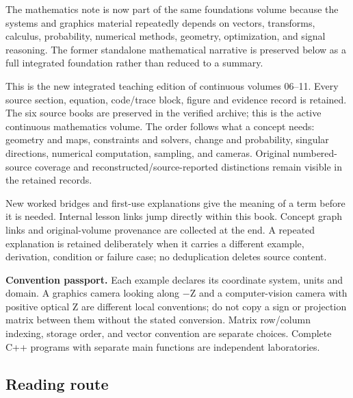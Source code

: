 \hypertarget{01-foundations-i-ch017-mathematical-foundations-for-visual-computing-from-vectors-to-images}{}

The mathematics note is now part of the same foundations volume because the systems and graphics material repeatedly depends on vectors, transforms, calculus, probability, numerical methods, geometry, optimization, and signal reasoning. The former standalone mathematical narrative is preserved below as a full integrated foundation rather than reduced to a summary.

This is the new integrated teaching edition of continuous volumes 06--11. Every source section, equation, code/trace block, figure and evidence record is retained. The six source books are preserved in the verified archive; this is the active continuous mathematics volume. The order follows what a concept needs: geometry and maps, constraints and solvers, change and probability, singular directions, numerical computation, sampling, and cameras. Original numbered-source coverage and reconstructed/source-reported distinctions remain visible in the retained records.

New worked bridges and first-use explanations give the meaning of a term before it is needed. Internal lesson links jump directly within this book. Concept graph links and original-volume provenance are collected at the end. A repeated explanation is retained deliberately when it carries a different example, derivation, condition or failure case; no deduplication deletes source content.

\textbf{Convention passport.} Each example declares its coordinate system, units and domain. A graphics camera looking along −Z and a computer-vision camera with positive optical Z are different local conventions; do not copy a sign or projection matrix between them without the stated conversion. Matrix row/column indexing, storage order, and vector convention are separate choices. Complete C++ programs with separate main functions are independent laboratories.

\subsection{Reading route}\label{01-foundations-i-ch017-reading-route}

\hypertarget{01-foundations-i-ch017-reading-route}{}

